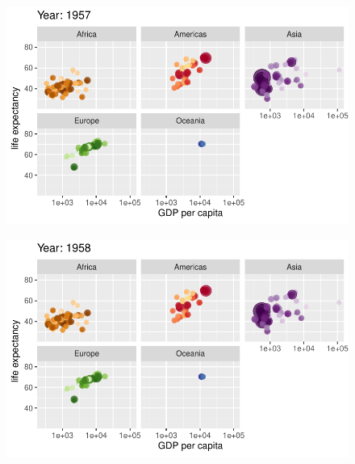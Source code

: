 \documentclass[
  letterpaper,
  DIV=11,
  numbers=noendperiod]{scrartcl}
\begin{document}
\begin{figure}[H]

{\centering \includegraphics{class05_files/figure-pdf/unnamed-chunk-24-10.pdf}

}

\end{figure}

\begin{figure}[H]

{\centering \includegraphics{class05_files/figure-pdf/unnamed-chunk-24-11.pdf}

}

\end{figure}
\end{document}
